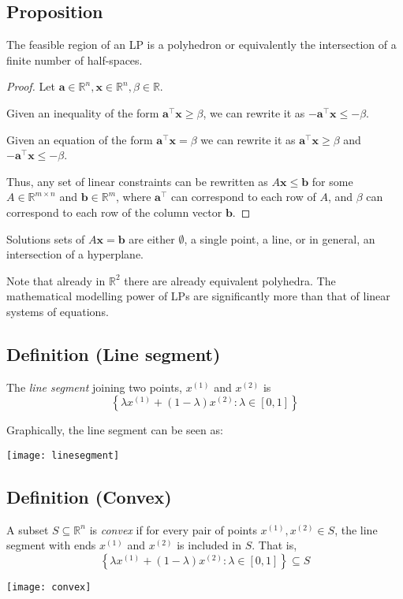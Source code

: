 \begin{thmbox}
    \subsection{Proposition}
    The feasible region of an LP is a polyhedron or equivalently the
    intersection of a finite number of half-spaces.
\end{thmbox}
\begin{proof}
    Let $ \bm{a}\in\mathbb{R}^n,\bm{x}\in\mathbb{R}^n,\beta\in \mathbb{R} $.

    Given an inequality of the form $ \bm{a} ^\top \bm{x}\ge \beta $, we can
    rewrite it as $ -\bm{a} ^\top \bm{x}\le -\beta $.

    Given an equation of the form $ \bm{a} ^\top \bm{x}=\beta $ we can rewrite it as
    $ \bm{a} ^\top \bm{x}\ge \beta $ and $ -\bm{a} ^\top \bm{x}\le -\beta $.

    Thus, any set of linear constraints can be rewritten as 
    $ A\bm{x}\le \bm{b} $ for some $ A\in \mathbb{R}^{m \times n} $ and $ \bm{b}\in \mathbb{R}^m $, where $ \bm{a}^\top $ can correspond to each row of $ A $,
    and $ \beta $ can correspond to each row of the column vector $ \bm{b} $.
\end{proof}

Solutions sets of $ A\bm{x}=\bm{b} $ are either $ \emptyset $, a single
point, a line, or in general, an intersection of a hyperplane.

Note that already in $ \mathbb{R}^2 $ there are already equivalent polyhedra.
The mathematical modelling power of LPs are significantly more than that of
linear systems of equations.

\begin{defbox}
    \subsection{Definition (Line segment)}
    The \emph{line segment} joining two points, $ x^{(1)} $ and $ x^{(2)} $ is
    \[ \left\{\lambda x^{(1)} + (1-\lambda)x^{(2)}:\lambda\in[0,1]\right\} \]
\end{defbox}
Graphically, the line segment can be seen as:
\begin{center}
    \texttt{[image: linesegment]}
\end{center}

\begin{defbox}
    \subsection{Definition (Convex)}
    A subset $ S\subseteq \mathbb{R}^n $ is \emph{convex} if for 
    every pair of points $ x^{(1)},x^{(2)}\in S $, the line segment with
    ends $ x^{(1)} $ and $ x^{(2)} $ is included in $ S $. That is,
    \[ \left\{\lambda x^{(1)} + (1-\lambda)x^{(2)}:\lambda\in[0,1]\right\}\subseteq S \]
    
\end{defbox}
\begin{center}
    \texttt{[image: convex]}
\end{center}


